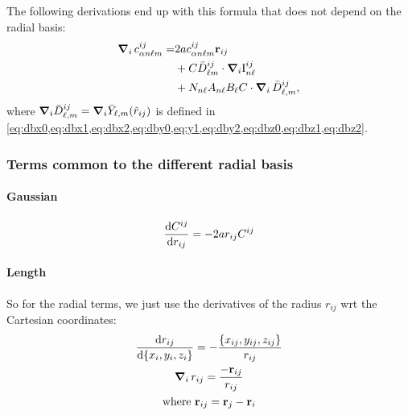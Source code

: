 \documentclass[
journal=jctcce, %
manuscript=article, layout=onecolumn]{achemso}
\begin{document}
The following derivations end up with this formula that does not depend on the radial basis:
\begin{align}
    \grad_i\,c^{ij}_{\alpha n \ell m} =& 2a c^{ij}_{\alpha n \ell m} \mathbf{r}_{ij}\nonumber\\
    &{} +  C \bar{D}^{ij}_{\ell m} \cdot \grad_i \text{I}_{n\ell}^{ij}\nonumber\\
    &{} + N_{n \ell}A_{n\ell} B_\ell C \cdot \grad_i\,\bar{D}^{ij}_{\ell,m},
\end{align}
where $\grad_i\bar{D}^{ij}_{\ell,m} = \grad_i \bar{Y}_{\ell,m}(\hat{r}_{ij})$ is defined in \cref{eq:dbx0,eq:dbx1,eq:dbx2,eq:dby0,eq:y1,eq:dby2,eq:dbz0,eq:dbz1,eq:dbz2}.

\subsubsection{Terms common to the different radial basis}
\paragraph{Gaussian}

\begin{gather}
    \dv{C^{ij}}{r_{ij}} = -2ar_{ij}C^{ij}
\end{gather}

\paragraph{Length}

So for the radial terms, we just use the derivatives of the radius $r_{ij}$ wrt the Cartesian coordinates:
\begin{gather}
    \dv{ r_{ij}}{ \{x_i, y_i, z_i\}} = -\frac{\{x_{ij}, y_{ij}, z_{ij}\}}{r_{ij}}\\
    \grad_i\,r_{ij} = \frac{-\mathbf{r}_{ij}}{r_{ij}}\\
    \text{where }\mathbf{r}_{ij} = \mathbf{r}_j - \mathbf{r}_i
\end{gather}
\end{document}
